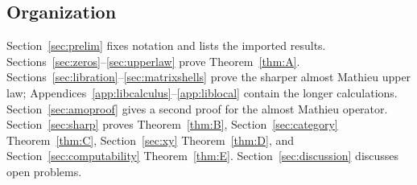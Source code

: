 \subsection{Organization}

Section~\ref{sec:prelim} fixes notation and lists the imported results. Sections~\ref{sec:zeros}--\ref{sec:upperlaw} prove Theorem~\ref{thm:A}. Sections~\ref{sec:libration}--\ref{sec:matrixshells} prove the sharper almost Mathieu upper law; Appendices~\ref{app:libcalculus}--\ref{app:liblocal} contain the longer calculations. Section~\ref{sec:amoproof} gives a second proof for the almost Mathieu operator. Section~\ref{sec:sharp} proves Theorem~\ref{thm:B}, Section~\ref{sec:category} Theorem~\ref{thm:C}, Section~\ref{sec:xy} Theorem~\ref{thm:D}, and Section~\ref{sec:computability} Theorem~\ref{thm:E}. Section~\ref{sec:discussion} discusses open problems.
